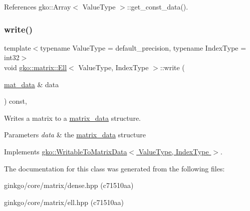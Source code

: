 References gko\+::\+Array$<$ Value\+Type $>$\+::get\+\_\+const\+\_\+data().

\mbox{\label{classgko_1_1matrix_1_1Ell_afa9148a16a9255003055d8e9156ee941}} 
\subsubsection{\texorpdfstring{write()}{write()}}
{\footnotesize\ttfamily template$<$typename Value\+Type = default\+\_\+precision, typename Index\+Type = int32$>$ \\
void \hyperlink{classgko_1_1matrix_1_1Ell}{gko\+::matrix\+::\+Ell}$<$ Value\+Type, Index\+Type $>$\+::write (\begin{DoxyParamCaption}\item[{\hyperlink{structgko_1_1matrix__data}{mat\+\_\+data} \&}]{data }\end{DoxyParamCaption}) const\hspace{0.3cm}{\ttfamily [override]}, {\ttfamily [virtual]}}



Writes a matrix to a \hyperlink{structgko_1_1matrix__data}{matrix\+\_\+data} structure. 


\begin{DoxyParams}{Parameters}
{\em data} & the \hyperlink{structgko_1_1matrix__data}{matrix\+\_\+data} structure \\
\hline
\end{DoxyParams}


Implements \hyperlink{classgko_1_1WritableToMatrixData_a96036c3a4bf4c67fa93002808b8b14e2}{gko\+::\+Writable\+To\+Matrix\+Data$<$ Value\+Type, Index\+Type $>$}.



The documentation for this class was generated from the following files\+:\begin{DoxyCompactItemize}
\item 
ginkgo/core/matrix/dense.\+hpp (c71510aa)\item 
ginkgo/core/matrix/ell.\+hpp (c71510aa)\end{DoxyCompactItemize}
